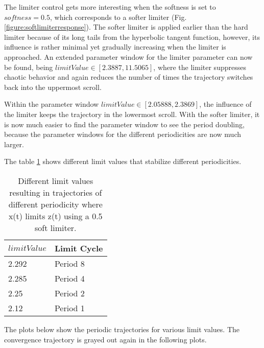 \documentclass[main]{subfiles}
\begin{document}

The limiter control gets more interesting when the softness is set to \(softness=0.5\), which corresponds to a softer limiter (Fig. \ref{figure:softlimiterresponse}). %
%
The softer limiter is applied earlier than the hard limiter because of its long tails from the hyperbolic tangent function, however, its influence is rather minimal yet gradually increasing when the limiter is approached. %
%
An extended parameter window for the limiter parameter can now be found, being \(limitValue \in [2.3887,11.5065]\), where the limiter suppresses chaotic behavior and again reduces the number of times the trajectory switches back into the uppermost scroll.

Within the parameter window \(limitValue \in [2.05888,2.3869]\), the influence of the limiter keeps the trajectory in the lowermost scroll. %
%
With the softer limiter, it is now much easier to find the parameter window to see the period doubling, because the parameter windows for the different periodicities are now much larger. 

The table \ref{table:z-0.5-periodicities} shows different limit values that stabilize different periodicities.

\begin{table}[H]
\renewcommand{\arraystretch}{1.2}
\center
\begin{tabular}{@{}ll@{}}
	\toprule
   \(limitValue\) & Limit Cycle\\
   \midrule
   2.292 & Period 8 \\ 
   2.285 & Period 4 \\
   2.25  & Period 2 \\
   2.12 & Period 1 \\
   \bottomrule
\end{tabular}
\caption[Limiter values for periodic trajectories for an x limiting z limiter with softness 0.5]{Different limit values resulting in trajectories of different periodicity where x(t) limits z(t) using a 0.5 soft limiter.}
\label{table:z-0.5-periodicities}
\end{table}

The plots below show the periodic trajectories for various limit values. The convergence trajectory is grayed out again in the following plots.

\end{document}
